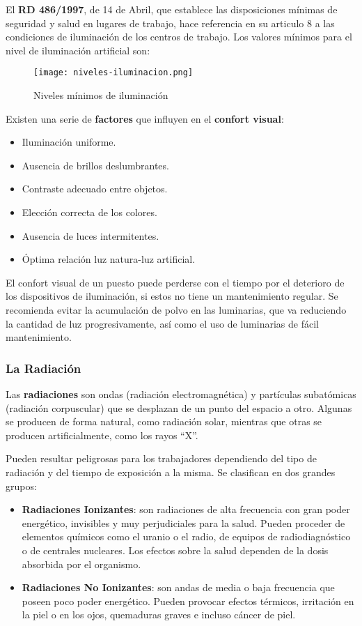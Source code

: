 El \textbf{RD 486/1997}, de 14 de Abril, que establece las disposiciones mínimas de seguridad y salud en lugares de trabajo, hace referencia en su articulo 8 a las condiciones de iluminación de los centros de trabajo. Los valores mínimos para el nivel de iluminación artificial son:

\begin{figure}[H]
    \centering
    \texttt{[image: niveles-iluminacion.png]}
    \caption{Niveles mínimos de iluminación}
\end{figure}

Existen una serie de \textbf{factores} que influyen en el \textbf{confort visual}:

\begin{itemize}
    \item Iluminación uniforme.
    \item Ausencia de brillos deslumbrantes.
    \item Contraste adecuado entre objetos.
    \item Elección correcta de los colores.
    \item Ausencia de luces intermitentes.
    \item Óptima relación luz natura-luz artificial.
\end{itemize}

El confort visual de un puesto puede perderse con el tiempo por el deterioro de los dispositivos de iluminación, si estos no tiene un mantenimiento regular. Se recomienda evitar la acumulación de polvo en las luminarias, que va reduciendo la cantidad de luz progresivamente, así como el uso de luminarias de fácil mantenimiento.

\subsubsection{La Radiación}
Las \textbf{radiaciones} son ondas (radiación electromagnética) y partículas subatómicas (radiación corpuscular) que se desplazan de un punto del espacio a otro. Algunas se producen de forma natural, como radiación solar, mientras que otras se producen artificialmente, como los rayos ``X''.

Pueden resultar peligrosas para los trabajadores dependiendo del tipo de radiación y del tiempo de exposición a la misma. Se clasifican en dos grandes grupos:

\begin{itemize}
    \item \textbf{Radiaciones Ionizantes}: son radiaciones de alta frecuencia con gran poder energético, invisibles y muy perjudiciales para la salud. Pueden proceder de elementos químicos como el uranio o el radio, de equipos de radiodiagnóstico o de centrales nucleares. Los efectos sobre la salud dependen de la dosis absorbida por el organismo.

    \item \textbf{Radiaciones No Ionizantes}: son andas de media o baja frecuencia que poseen poco poder energético. Pueden provocar efectos térmicos, irritación en la piel o en los ojos, quemaduras graves e incluso cáncer de piel.
\end{itemize}

